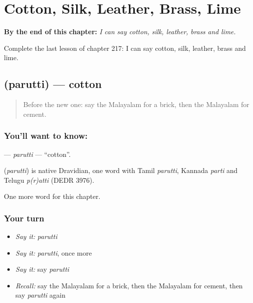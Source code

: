 
\chapter{Cotton, Silk, Leather, Brass, Lime}
\label{ch:ml-cotton-silk-leather-brass-lime}

\begin{chapteropening}
\textbf{By the end of this chapter:} \emph{I can say cotton, silk, leather, brass and lime.}

Complete the last lesson of chapter 217: I can say cotton, silk, leather, brass and lime.
\end{chapteropening}

\section[\texorpdfstring{\ml{പരുത്തി} (parutti)}{പരുത്തി (parutti)}]{ (parutti) — cotton}

\label{lesson:ML-C217-parutti}



\begin{quote}
Before the new one: say the Malayalam for a brick, then the Malayalam for cement.
\end{quote}

\subsection*{You'll want to know: }
\textbf{} — \emph{parutti} — \textquotedblleft{}cotton\textquotedblright{}.

\begin{cousinweb}
\textbf{} (\emph{parutti}) is native Dravidian, one word with Tamil \emph{parutti}, Kannada \emph{parti} and Telugu \emph{p(r)atti} (DEDR 3976).
\end{cousinweb}

\begin{grammarlens}[title={What you've built}]
One more word for this chapter.
\end{grammarlens}

\subsection*{Your turn}
\begin{itemize}
\raggedright
  \item \emph{Say it:} \emph{parutti}
  \item \emph{Say it:} \emph{parutti}, once more
  \item \emph{Say it:} say \emph{parutti}
  \item \emph{Recall:} say the Malayalam for a brick, then the Malayalam for cement, then say \emph{parutti} again
\end{itemize}


